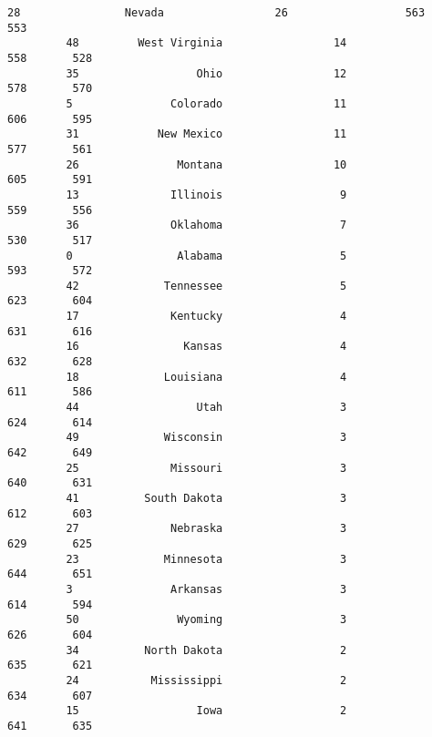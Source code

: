 \documentclass[11pt]{article}
\begin{document}
\begin{Verbatim}[commandchars=\\\{\}]
         28                Nevada                 26                  563       553   
         48         West Virginia                 14                  558       528   
         35                  Ohio                 12                  578       570   
         5               Colorado                 11                  606       595   
         31            New Mexico                 11                  577       561   
         26               Montana                 10                  605       591   
         13              Illinois                  9                  559       556   
         36              Oklahoma                  7                  530       517   
         0                Alabama                  5                  593       572   
         42             Tennessee                  5                  623       604   
         17              Kentucky                  4                  631       616   
         16                Kansas                  4                  632       628   
         18             Louisiana                  4                  611       586   
         44                  Utah                  3                  624       614   
         49             Wisconsin                  3                  642       649   
         25              Missouri                  3                  640       631   
         41          South Dakota                  3                  612       603   
         27              Nebraska                  3                  629       625   
         23             Minnesota                  3                  644       651   
         3               Arkansas                  3                  614       594   
         50               Wyoming                  3                  626       604   
         34          North Dakota                  2                  635       621   
         24           Mississippi                  2                  634       607   
         15                  Iowa                  2                  641       635   
         

\end{Verbatim}
\end{document}
